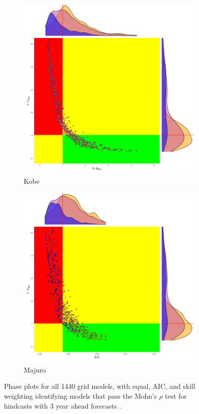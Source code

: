 \begin{figure}
        \begin{subfigure}[b]{0.5\textwidth}
                \includegraphics[width=\linewidth]{figures/kobe-mohn3-2.png}
                \caption{Kobe}
                \label{fig:kobe-wt}
        \end{subfigure}%
        \begin{subfigure}[b]{0.5\textwidth}
                \includegraphics[width=\linewidth]{figures/majuro-mohn3-all-1.png}
                \caption{Majuro}
                \label{fig:majuro-wt}
        \end{subfigure}%
        \caption{Phase plots for all 1440 grid models, with equal, AIC, and skill weighting identifying models that pass the Mohn's $\rho$ test for hindcasts with 3 year ahead forecasts .}
        \label{fig:phase-wt}
\end{figure}


